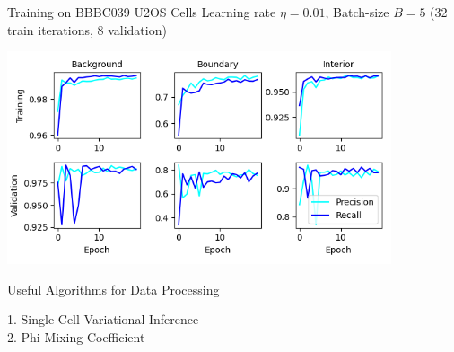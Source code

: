 \documentclass[aspectratio=1610]{beamer}					%
\begin{document}
\begin{frame}{Training on BBBC039 U2OS Cells}
Learning rate $\eta=0.01$, Batch-size $B=5$ (32 train iterations, 8 validation)
\begin{center}
\includegraphics[width=0.85\textwidth]{metrics.png}
\end{center}

\end{frame}

\begin{frame}{Useful Algorithms for Data Processing}

1. Single Cell Variational Inference\\
2. Phi-Mixing Coefficient

\end{frame}
\end{document}
